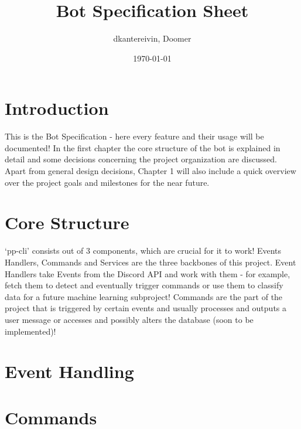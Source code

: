 \documentclass[12pt,oneside]{book}
\title{Bot Specification Sheet}
\author{dkantereivin, Doomer}
\date{\today}
\begin{document}
\maketitle
\tableofcontents
\chapter{Introduction}
    This is the Bot Specification - here every feature and their usage will
    be documented! In the first chapter the core structure of the bot is 
    explained in detail and some decisions concerning the project organization
    are discussed. Apart from general design decisions, Chapter 1 will also 
    include a quick overview over the project goals and milestones for the 
    near future.

\chapter[Core]{Core Structure}
    `pp-cli' consists out of 3 components, which are crucial for it to work!
    Events Handlers, Commands and Services are the three backbones of this 
    project. Event Handlers take Events from the Discord API and work with 
    them - for example, fetch them to detect and eventually trigger commands
    or use them to classify data for a future machine learning subproject!
    Commands are the part of the project that is triggered by certain events
    and usually processes and outputs a user message or accesses and possibly
    alters the database (soon to be implemented)!

\chapter[Events]{Event Handling}

\chapter[Commands]{Commands}
\end{document}
